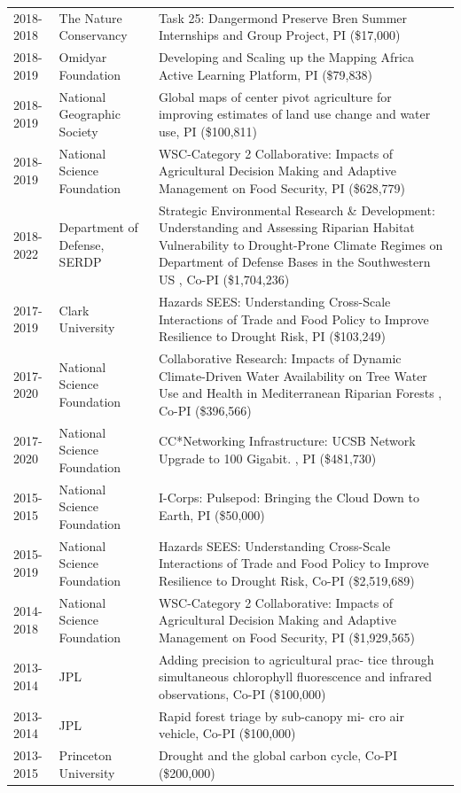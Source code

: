 \begin{longtable}{p{1.75cm}>{\raggedright}p{}p{12cm}}
2018-2018 & The Nature Conservancy & Task 25: Dangermond Preserve Bren Summer Internships and Group Project, PI (\$17,000) \\ 
2018-2019 & Omidyar Foundation & Developing and Scaling up the Mapping Africa Active Learning Platform, PI (\$79,838) \\ 
2018-2019 & National Geographic Society & Global maps of center pivot agriculture for improving estimates of land use change and water use, PI (\$100,811) \\ 
2018-2019 & National Science Foundation & WSC-Category 2 Collaborative: Impacts of Agricultural Decision Making and Adaptive Management on Food Security, PI (\$628,779) \\ 
2018-2022 & Department of Defense, SERDP & Strategic Environmental Research \& Development: Understanding and Assessing Riparian Habitat Vulnerability to Drought-Prone Climate Regimes on Department of Defense Bases in the Southwestern US 
, Co-PI (\$1,704,236) \\ 
2017-2019 & Clark University & Hazards SEES: Understanding Cross-Scale Interactions of Trade and Food Policy to Improve Resilience to Drought Risk, PI (\$103,249) \\ 
2017-2020 & National Science Foundation & Collaborative Research: Impacts of Dynamic Climate-Driven Water Availability on Tree Water Use and Health in Mediterranean Riparian Forests 
, Co-PI (\$396,566) \\ 
2017-2020 & National Science Foundation & CC*Networking Infrastructure: UCSB Network Upgrade to 100 Gigabit. , PI (\$481,730) \\ 
2015-2015 & National Science Foundation & I-Corps: Pulsepod: Bringing the Cloud Down to Earth, PI (\$50,000) \\ 
2015-2019 & National Science Foundation & Hazards SEES: Understanding Cross-Scale Interactions of Trade and Food Policy to Improve Resilience to Drought Risk, Co-PI (\$2,519,689) \\ 
2014-2018 & National Science Foundation & WSC-Category 2 Collaborative: Impacts of Agricultural Decision Making and Adaptive Management on Food Security, PI (\$1,929,565) \\ 
2013-2014 & JPL & Adding precision to agricultural prac- tice through simultaneous chlorophyll fluorescence and infrared observations, Co-PI (\$100,000) \\ 
2013-2014 & JPL & Rapid forest triage by sub-canopy mi- cro air vehicle, Co-PI (\$100,000) \\ 
2013-2015 & Princeton University & Drought and the global carbon cycle, Co-PI (\$200,000) \\ 

\end{longtable}
